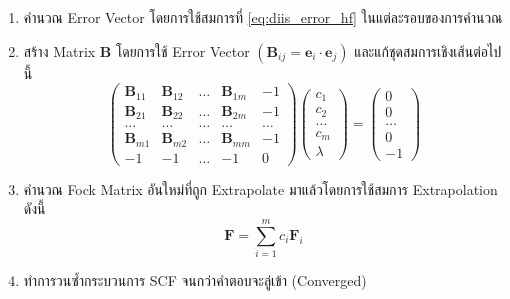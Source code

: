 \begin{enumerate}[topsep=0pt,noitemsep]
  \setlength\itemsep{1em}
  \item คำนวณ Error Vector โดยการใช้สมการที่ \eqref{eq:diis_error_hf} ในแต่ละรอบของการคำนวณ

  \item สร้าง Matrix $\mathbf{B}$ โดยการใช้ Error Vector $(\mathbf{B}_{ij} = \mathbf{e}_i \cdot \mathbf{e}_j)$
        และแก้ชุดสมการเชิงเส้นต่อไปนี้
        \begin{equation}
          \begin{pmatrix}
            \mathbf{B}_{11} & \mathbf{B}_{12} & \dots & \mathbf{B}_{1m} & -1    \\
            \mathbf{B}_{21} & \mathbf{B}_{22} & \dots & \mathbf{B}_{2m} & -1    \\
            \dots           & \dots           & \dots & \dots           & \dots \\
            \mathbf{B}_{m1} & \mathbf{B}_{m2} & \dots & \mathbf{B}_{mm} & -1    \\
            -1              & -1              & \dots & -1              & 0
          \end{pmatrix}
          \begin{pmatrix}
            c_1   \\
            c_2   \\
            \dots \\
            c_m   \\
            \lambda
          \end{pmatrix}
          =
          \begin{pmatrix}
            0     \\
            0     \\
            \dots \\
            0     \\
            -1
          \end{pmatrix}
        \end{equation}

  \item คำนวณ Fock Matrix อันใหม่ที่ถูก Extrapolate มาแล้วโดยการใช้สมการ Extrapolation ดังนี้
        \begin{equation}
          \mathbf{F}
          =
          \sum_{i=1}^{m} c_i \mathbf{F}_i
        \end{equation}

  \item ทำการวนซ้ำกระบวนการ SCF จนกว่าคำตอบจะลู่เข้า (Converged)
\end{enumerate}

